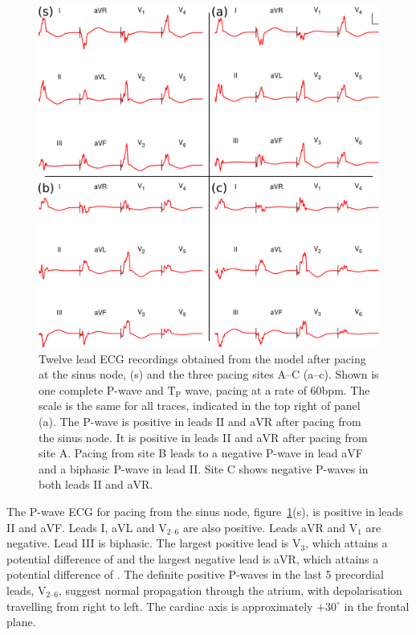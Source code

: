 \begin{figure}
\begin{center}
\includegraphics{figures/forward/inverted_p_wave/inverted_pwave_ecg}
\end{center}
\caption[12 Lead ECG traces from pacing sites along the CT]{
\label{fig:forward:inverse:ecgs}
Twelve lead ECG recordings obtained from the model after pacing at the sinus
node, (s) and the three pacing sites A--C (a--c).
Shown is one complete P-wave and $\text{T}_{\text{P}}$ wave, pacing at a rate of
\unit{60}{bpm}.
The scale is the same for all traces, indicated in the top right of panel (a).
The P-wave is positive in leads II and aVR after pacing from the sinus node.
It is positive in leads II and aVR after pacing from site A.
Pacing from site B leads to a negative P-wave in lead aVF and a biphasic P-wave
in lead II.
Site C shows negative P-waves in both leads II and aVR.
}
\end{figure}


The P-wave ECG for pacing from the sinus node,
figure~\ref{fig:forward:inverse:ecgs}(s), is positive in leads II and aVF.
Leads I, aVL and $\text{V}_{\text{2--6}}$ are also positive.
Leads aVR and $\text{V}_{\text{1}}$ are negative.
Lead III is biphasic.
The largest positive lead is $\text{V}_{\text{3}}$, which attains a potential
difference of  and the largest negative lead is aVR,
which attains a potential difference of .
The definite positive P-waves in the last 5 precordial leads,
$\text{V}_{\text{2--6}}$, suggest normal propagation through the atrium, with
depolarisation travelling from right to left.
The cardiac axis is approximately $+30^\circ$ in the frontal plane.


